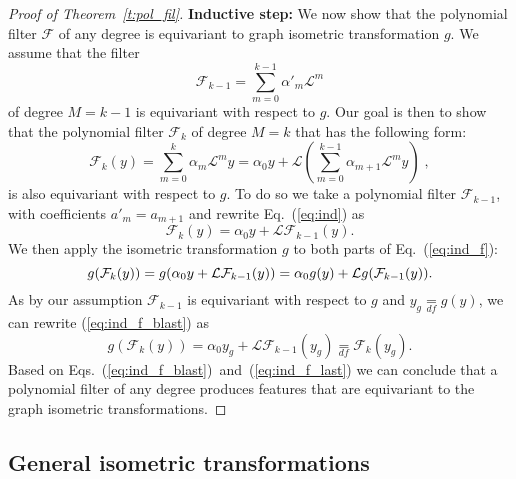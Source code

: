 \documentclass[10pt,journal,compsoc]{IEEEtran}
\newcommand{\df}{\mathop{=}\limits_{df}}
\newcommand{\mF}{\mathcal{F}}
\begin{document}
\begin{proof}[Proof of Theorem~\ref{t:pol_fil}]
		\textbf{Inductive step: } We now show that the polynomial filter $\mathcal{F}$ of any degree is equivariant to graph isometric transformation $g$. We assume that the filter
		\begin{equation}
		\mathcal{F}_{k-1}=\sum_{m=0}^{k-1} \alpha'_m \mathcal{L}^m
		\end{equation}
		\noindent
		of degree $M = k-1$ is equivariant with respect to $g$. Our goal is then to show that the polynomial filter $\mathcal{F}_k$ of degree $M = k$ that has the following form:
		\begin{equation}
		\mathcal{F}_{k}(y) = \sum\limits_{m=0}^{k} \alpha_m \mathcal{L}^m y =
		\alpha_0 y + \mathcal{L} \left(\sum\limits_{m=0}^{k-1} \alpha_{m+1} \mathcal{L}^{m} y \right) \;,
		\label{eq:ind}
		\end{equation}
		\noindent
		is also equivariant with respect to $g$.
		To do so we take a polynomial filter $\mF_{k-1}$, with coefficients $a'_m = a_{m+1}$  and rewrite Eq.~(\ref{eq:ind}) as
		\begin{equation}
		\mathcal{F}_{k}(y) = \alpha_0 y + \mathcal{L} \mathcal{F}_{k-1}(y).
		\label{eq:ind_f}
		\end{equation}
		\noindent
We then apply the isometric transformation $g$ to both parts of Eq.~(\ref{eq:ind_f}):
		\begin{equation}
		\small
		g(\mathcal{F}_{k}(y)) = g(\alpha_0 y + \mathcal{L} \mathcal{F}_{k-1}(y)) = \alpha_0 g(y) + \mathcal{L} g(\mathcal{F}_{k-1}(y)).
		\label{eq:ind_f_blast}
		\end{equation}
		\noindent
As by our assumption $\mathcal{F}_{k-1}$ is equivariant with respect to $g$ and $y_g \df g(y)$, we can rewrite (\ref{eq:ind_f_blast}) as
		\begin{equation}
		g(\mathcal{F}_{k}(y)) = \alpha_0 y_g + \mathcal{L} \mathcal{F}_{k-1}(y_g) \df \mathcal{F}_{k}(y_g).
		\label{eq:ind_f_last}
		\end{equation}
		\noindent
Based on Eqs.~(\ref{eq:ind_f_blast})~and~(\ref{eq:ind_f_last}) we can conclude that a polynomial filter of any degree produces features  that are equivariant  to the graph isometric transformations.

	\end{proof}


	\subsection{General isometric transformations}
	\label{s:git}
\end{document}
